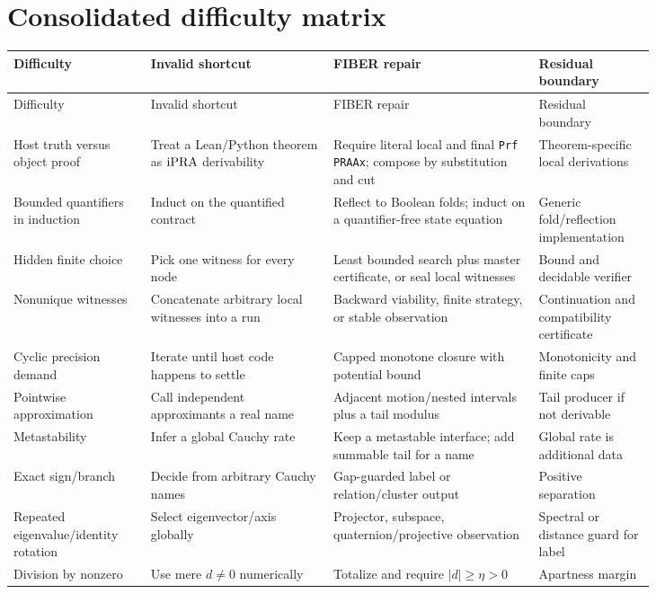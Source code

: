 \section{Consolidated difficulty matrix}
\label{app:matrix}

\footnotesize
\setlength{\tabcolsep}{4pt}
\begin{longtable}{Y{0.17\linewidth}Y{0.24\linewidth}Y{0.27\linewidth}Y{0.15\linewidth}}
\toprule
Difficulty & Invalid shortcut & FIBER repair & Residual boundary\\
\midrule
\endfirsthead
\toprule
Difficulty & Invalid shortcut & FIBER repair & Residual boundary\\
\midrule
\endhead
Host truth versus object proof & Treat a Lean/Python theorem as \(\mathrm{iPRA}\) derivability & Require literal local and final \texttt{Prf PRAAx}; compose by substitution and cut & Theorem-specific local derivations\\
Bounded quantifiers in induction & Induct on the quantified contract & Reflect to Boolean folds; induct on a quantifier-free state equation & Generic fold/reflection implementation\\
Hidden finite choice & Pick one witness for every node & Least bounded search plus master certificate, or seal local witnesses & Bound and decidable verifier\\
Nonunique witnesses & Concatenate arbitrary local witnesses into a run & Backward viability, finite strategy, or stable observation & Continuation and compatibility certificate\\
Cyclic precision demand & Iterate until host code happens to settle & Capped monotone closure with potential bound & Monotonicity and finite caps\\
Pointwise approximation & Call independent approximants a real name & Adjacent motion/nested intervals plus a tail modulus & Tail producer if not derivable\\
Metastability & Infer a global Cauchy rate & Keep a metastable interface; add summable tail for a name & Global rate is additional data\\
Exact sign/branch & Decide from arbitrary Cauchy names & Gap-guarded label or relation/cluster output & Positive separation\\
Repeated eigenvalue/identity rotation & Select eigenvector/axis globally & Projector, subspace, quaternion/projective observation & Spectral or distance guard for label\\
Division by nonzero & Use mere \(d\ne0\) numerically & Totalize and require \(|d|\ge\eta>0\) & Apartness margin\\

\end{longtable}
